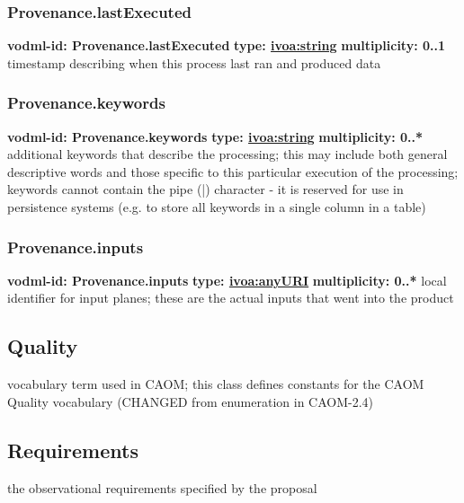     \subsubsection{Provenance.lastExecuted}
      \textbf{vodml-id: Provenance.lastExecuted} \newline
      \textbf{type: \hyperref[sect:ivoa]{ivoa:string}} \newline
      \textbf{multiplicity: 0..1} \newline
      timestamp describing when this process last ran and produced data

    \subsubsection{Provenance.keywords}
      \textbf{vodml-id: Provenance.keywords} \newline
      \textbf{type: \hyperref[sect:ivoa]{ivoa:string}} \newline
      \textbf{multiplicity: 0..*} \newline
      additional keywords that describe the processing; this may include both general descriptive words and those specific to this particular execution of the processing; keywords cannot contain the pipe (|) character - it is reserved for use in persistence systems (e.g. to store all keywords in a single column in a table)

    \subsubsection{Provenance.inputs}
      \textbf{vodml-id: Provenance.inputs} \newline
      \textbf{type: \hyperref[sect:ivoa]{ivoa:anyURI}} \newline
      \textbf{multiplicity: 0..*} \newline
      local identifier for input planes; these are the actual inputs that went into the product

  \subsection{Quality}
  \label{sect:Quality}
    vocabulary term used in CAOM; this class defines constants for the CAOM Quality vocabulary (CHANGED from enumeration in CAOM-2.4)

  \subsection{Requirements}
  \label{sect:Requirements}
    the observational requirements specified by the proposal

